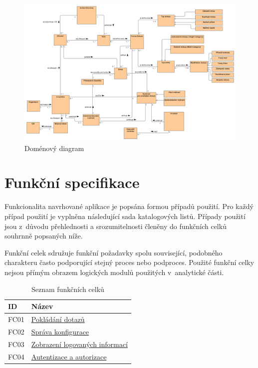 \documentclass[thesis=M,czech]{FITthesis}[2019/12/23]
\begin{document}
\begin{figure}[H]
  \centering
  \includegraphics[width=\textwidth]{res/design/Doménový diagram.png}
  \caption{Doménový diagram}
  \label{fig:Doménový diagram}
\end{figure}

\section{Funkční specifikace}
Funkcionalita navrhované aplikace je popsána formou případů použití. Pro každý případ použití je vyplněna následující sada katalogových listů. Případy použití jsou z~důvodu přehlednosti a srozumitelnosti členěny do funkčních celků souhrnně popsaných níže.

Funkční celek sdružuje funkční požadavky spolu související, podobného charakteru často podporující stejný proces nebo podproces. Použité funkční celky nejsou přímým obrazem logických modulů použitých v~analytické části.

\begin{table}[H]
	\centering
	\begin{tabular}{|p{}|p{}|}
		\hline
  		{\textbf{ID}} & {\textbf{Název}} \\
  		\hline \hline
  		FC01 & \hyperref[FC01]{Pokládání dotazů} \\ \hline
		FC02 & \hyperref[FC02]{Správa konfigurace} \\ \hline
		FC03 & \hyperref[FC03]{Zobrazení logovaných informací} \\ \hline
		FC04 & \hyperref[FC04]{Autentizace a autorizace} \\ \hline
	\end{tabular}
 	\caption{Seznam funkčních celků}
\label{tab:Seznam funkčních celků}
\end{table}
\end{document}
